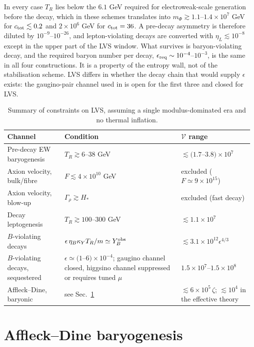 \documentclass[11pt]{article}
\newcommand{\vol}{\mathcal{V}}
\begin{document}
In every case $T_R$ lies below the $6.1$ GeV required for electroweak-scale generation before the decay, which in these schemes translates into $m_\Phi\gtrsim1.1$--$1.4\times10^7$ GeV for $c_{\rm tot}\lesssim0.2$ and $2\times10^6$ GeV for $c_{\rm tot}=36$. A pre-decay asymmetry is therefore diluted by $10^{-9}$--$10^{-26}$, and lepton-violating decays are converted with $\eta_L\lesssim10^{-8}$ except in the upper part of the LVS window. What survives is baryon-violating decay, and the required baryon number per decay, $\epsilon_{\rm req}\sim10^{-4}$--$10^{-3}$, is the same in all four constructions. It is a property of the entropy wall, not of the stabilisation scheme. LVS differs in whether the decay chain that would supply $\epsilon$ exists: the gaugino-pair channel used in \cite{KW} is open for the first three and closed for LVS.


\begin{table}[h]\centering\small
\begin{tabular}{p{4.0cm}p{5.6cm}p{4.9cm}}\toprule
Channel & Condition & $\vol$ range\\ \midrule
Pre-decay EW baryogenesis & $T_R\gtrsim6$--$38$ GeV & $\lesssim(1.7$--$3.8)\times10^7$\\
Axion velocity, bulk/fibre & $F\lesssim4\times10^{10}$ GeV & excluded ($F\simeq9\times10^{15}$)\\
Axion velocity, blow-up & $\Gamma_\rho\gtrsim H_*$ & excluded (fast decay)\\
Decay leptogenesis & $T_R\gtrsim100$--$300$ GeV & $\lesssim1.1\times10^7$\\
$B$-violating decays & $\epsilon\,\eta_B\kappa_YT_R/m\simeq Y_B^{\rm obs}$ & $\lesssim3.1\times10^{12}\epsilon^{4/3}$\\
$B$-violating decays, sequestered & $\epsilon\simeq(1$--$6)\times10^{-4}$; gaugino channel closed, higgsino channel suppressed or requires tuned $\mu$ & $1.5\times10^7$--$1.5\times10^8$\\
Affleck--Dine, baryonic & see Sec.~\ref{sec:ad} & $\lesssim6\times10^5\,\zeta$; $\lesssim10^4$ in the effective theory\\ \bottomrule
\end{tabular}
\caption{Summary of constraints on LVS, assuming a single modulus-dominated era and no thermal inflation.}\label{tab:sum}\end{table}

\section{Affleck--Dine baryogenesis}\label{sec:ad}
\end{document}
